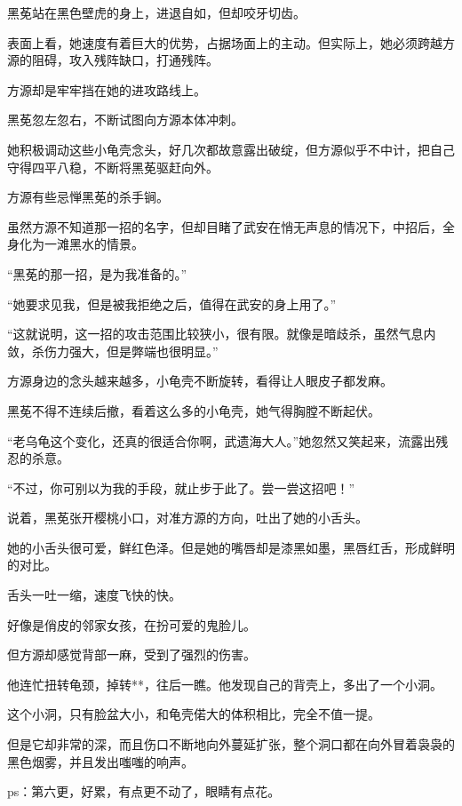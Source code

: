 \begin{this_body}
黑莬站在黑色壁虎的身上，进退自如，但却咬牙切齿。

表面上看，她速度有着巨大的优势，占据场面上的主动。但实际上，她必须跨越方源的阻碍，攻入残阵缺口，打通残阵。

方源却是牢牢挡在她的进攻路线上。

黑莬忽左忽右，不断试图向方源本体冲刺。

她积极调动这些小龟壳念头，好几次都故意露出破绽，但方源似乎不中计，把自己守得四平八稳，不断将黑莬驱赶向外。

方源有些忌惮黑莬的杀手锏。

虽然方源不知道那一招的名字，但却目睹了武安在悄无声息的情况下，中招后，全身化为一滩黑水的情景。

“黑莬的那一招，是为我准备的。”

“她要求见我，但是被我拒绝之后，值得在武安的身上用了。”

“这就说明，这一招的攻击范围比较狭小，很有限。就像是暗歧杀，虽然气息内敛，杀伤力强大，但是弊端也很明显。”

方源身边的念头越来越多，小龟壳不断旋转，看得让人眼皮子都发麻。

黑莬不得不连续后撤，看着这么多的小龟壳，她气得胸膛不断起伏。

“老乌龟这个变化，还真的很适合你啊，武遗海大人。”她忽然又笑起来，流露出残忍的杀意。

“不过，你可别以为我的手段，就止步于此了。尝一尝这招吧！”

说着，黑莬张开樱桃小口，对准方源的方向，吐出了她的小舌头。

她的小舌头很可爱，鲜红色泽。但是她的嘴唇却是漆黑如墨，黑唇红舌，形成鲜明的对比。

舌头一吐一缩，速度飞快的快。

好像是俏皮的邻家女孩，在扮可爱的鬼脸儿。

但方源却感觉背部一麻，受到了强烈的伤害。

他连忙扭转龟颈，掉转**，往后一瞧。他发现自己的背壳上，多出了一个小洞。

这个小洞，只有脸盆大小，和龟壳偌大的体积相比，完全不值一提。

但是它却非常的深，而且伤口不断地向外蔓延扩张，整个洞口都在向外冒着袅袅的黑色烟雾，并且发出嗤嗤的响声。

ps：第六更，好累，有点更不动了，眼睛有点花。

\end{this_body}

